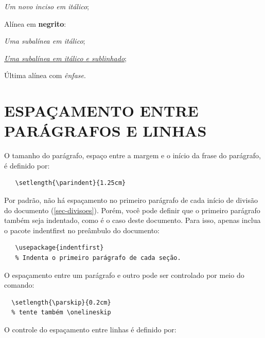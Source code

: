 \begin{alineas}
  \begin{incisos}
    \item \textit{Um novo inciso em itálico};
  \end{incisos}
  
  \item Alínea em \textbf{negrito}:
  
  \begin{subalineas}
    \item \textit{Uma subalínea em itálico};
    \item \underline{\textit{Uma subalínea em itálico e sublinhado}}; 
  \end{subalineas}
  
  \item Última alínea com \emph{ênfase}.
  
\end{alineas}

\section{\uppercase{Espaçamento entre parágrafos e linhas}}

O tamanho do parágrafo, espaço entre a margem
e o início da frase do parágrafo, é definido por:

\begin{verbatim}
   \setlength{\parindent}{1.25cm}
\end{verbatim}

Por padrão, não há espaçamento no
primeiro parágrafo de cada início de divisão do documento
(\autoref{sec-divisoes}). Porém, você pode definir que o primeiro parágrafo
também seja indentado, como é o caso deste documento. Para isso, apenas inclua o
pacote \textsf{indentfirst} no preâmbulo do documento:

\begin{verbatim}
   \usepackage{indentfirst}  
   % Indenta o primeiro parágrafo de cada seção.
\end{verbatim}

O espaçamento entre um parágrafo e outro
pode ser controlado por meio do comando:

\begin{verbatim}
  \setlength{\parskip}{0.2cm} 
  % tente também \onelineskip
\end{verbatim}

O controle do espaçamento entre linhas é
definido por:

